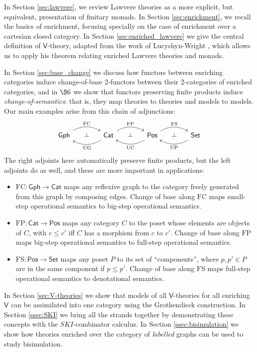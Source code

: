 \documentclass{amsart}
\theoremstyle{definition}
\def\ld{\rotatebox[origin=c]{-90}{$\dashv$}} %
\newcommand{\Gph}{\mathsf{Gph}}
\newcommand{\Set}{\mathsf{Set}}
\newcommand{\Cat}{\mathsf{Cat}}
\newcommand{\Pos}{\mathsf{Pos}}
\newcommand{\V}{\mathsf{V}}
\newcommand{\FC}{\mathrm{FC}}
\newcommand{\FP}{\mathrm{FP}}
\newcommand{\FS}{\mathrm{FS}}
\newcommand{\UC}{\mathrm{UC}}
\newcommand{\UP}{\mathrm{UP}}
\newcommand{\UG}{\mathrm{UG}}
\newcommand{\maps}{\colon}
\begin{document}
In Section \ref{sec:lawvere}, we review Lawvere theories as a more explicit, but equivalent, presentation of finitary monads. In Section \ref{sec:enrichment}, we recall the basics of enrichment, focusing specially on the case of enrichment over a cartesian
closed category.   In Section \ref{sec:enriched_lawvere} we give the central definition of $\V$-theory, adapted from the work of Lucyshyn-Wright \cite{lucyshyn-wright}, which allows us to apply his theorem relating enriched Lawvere theories and monads.

In Section \ref{sec:base_change} we discuss how functors between enriching categories induce change-of-base 2-functors between their 2-categories of enriched categories, and in $\S6$ we show that functors preserving finite products induce \textit{change-of-semantics}: that is, they map theories to theories and models to models.   Our main examples arise from this chain of adjunctions:
\[\begin{tikzcd}[column sep=small]
\Gph \arrow[bend left,below]{rr}{\FC}
& \ld &
\arrow[bend left,above]{ll}{\UG} \Cat \arrow[bend left,below]{rr}{\FP}
& \ld &
\arrow[bend left,above]{ll}{\UC} \Pos \arrow[bend left,below]{rr}{\FS}
& \ld &
\Set \arrow[bend left,above]{ll}{\UP}
\end{tikzcd}\]
The right adjoints here automatically preserve finite products, but the left adjoints 
do as well, and these are more important in applications:
\begin{itemize}
\item 
$\FC \maps \Gph \to \Cat$ maps any reflexive graph to the category freely generated from 
this graph by composing edges.  Change of base along $\FC$ maps small-step operational semantics to big-step operational semantics.
\item
$\FP \maps \Cat \to \Pos$ maps any category $C$ to the poset whose elements are objects of $C$, with $c \le c'$ iff $C$ has a morphism from $c$ to $c'$.
Change of base along $\FP$ maps big-step operational semantics to full-step operational semantics.
\item
$\FS \maps \Pos \to \Set$ maps any poset $P$ to its set of ``components'', where $p,p' \in P$ are in the same component if $p \le p'$.
Change of base along $\FS$ maps full-step operational semantics to
denotational semantics.
\end{itemize}

In Section \ref{sec:V-theories} we show that models of all $\V$-theories for all enriching $\V$ can be assimilated into one category using the Grothendieck construction.  In Section \ref{ssec:SKI} we bring all the strands together by demonstrating these concepts with the $SKI$-combinator calculus.  In Section \ref{ssec:bisimulation} we show how theories enriched over the category of \emph{labelled} graphs can be used to study bisimulation.
\end{document}
